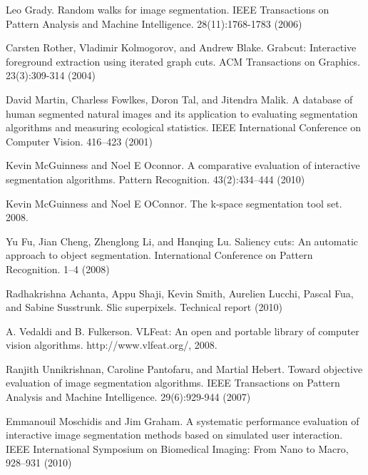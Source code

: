 \documentclass[runningheads,a4paper]{llncs}
\begin{document}
\begin{thebibliography}{4}
 Leo Grady. Random walks for image segmentation. IEEE Transactions on Pattern Analysis and Machine Intelligence. 28(11):1768-1783 (2006)




 Carsten Rother, Vladimir Kolmogorov, and Andrew Blake. Grabcut: Interactive foreground extraction using iterated graph cuts. ACM Transactions on Graphics. 23(3):309-314 (2004)

 David Martin, Charless Fowlkes, Doron Tal, and Jitendra Malik. A database of human segmented natural images and its application to evaluating segmentation algorithms and measuring ecological statistics. IEEE International Conference on Computer Vision. 416--423 (2001)

 Kevin McGuinness and Noel E Oconnor. A comparative evaluation of interactive segmentation algorithms. Pattern Recognition. 43(2):434--444 (2010)

 Kevin McGuinness and Noel E OConnor. The k-space segmentation tool set. 2008.

 Yu Fu, Jian Cheng, Zhenglong Li, and Hanqing Lu. Saliency cuts: An automatic approach to object segmentation. International Conference on Pattern Recognition. 1--4 (2008)

 Radhakrishna Achanta, Appu Shaji, Kevin Smith, Aurelien Lucchi, Pascal Fua, and Sabine Susstrunk. Slic superpixels. Technical report (2010)

 A. Vedaldi and B. Fulkerson. VLFeat: An open and portable library of computer vision algorithms. http://www.vlfeat.org/, 2008.

 Ranjith Unnikrishnan, Caroline Pantofaru, and Martial Hebert. Toward objective evaluation of image segmentation algorithms. IEEE Transactions on Pattern Analysis and Machine Intelligence. 29(6):929-944 (2007)

Emmanouil Moschidis and Jim Graham. A systematic performance evaluation of interactive image segmentation methods based on simulated user interaction. IEEE International Symposium on Biomedical Imaging: From Nano to Macro, 928--931 (2010)

\end{thebibliography}
\end{document}
